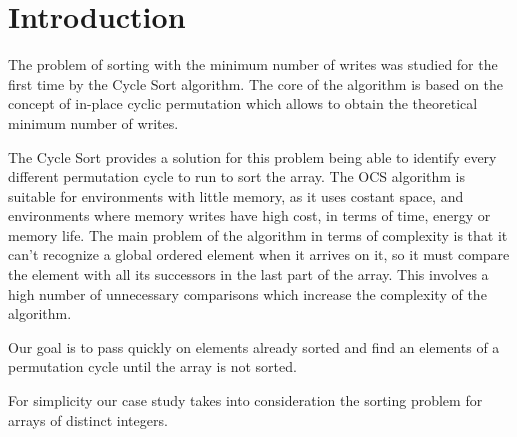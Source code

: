 
\section{Introduction}

The problem of sorting with the minimum number of writes was studied for the first time by the Cycle Sort algorithm. The core of the algorithm is based on the concept of in-place cyclic permutation which allows to obtain the theoretical minimum number of writes.

The Cycle Sort provides a solution for this problem being able to identify every different permutation cycle to run to sort the array. The OCS algorithm is suitable for environments with little memory, as it uses costant space, and environments where memory writes have high cost, in terms of time, energy or memory life.
The main problem of the algorithm in terms of complexity is that it can't recognize a global ordered element when it arrives on it, so it must compare the element with all its successors in the last part of the array. This involves a high number of unnecessary comparisons which increase the complexity of the algorithm.

Our goal is to pass quickly on elements already sorted and find an elements of a permutation cycle until the array is not sorted. 

For simplicity our case study takes into consideration the sorting problem for arrays of distinct integers.